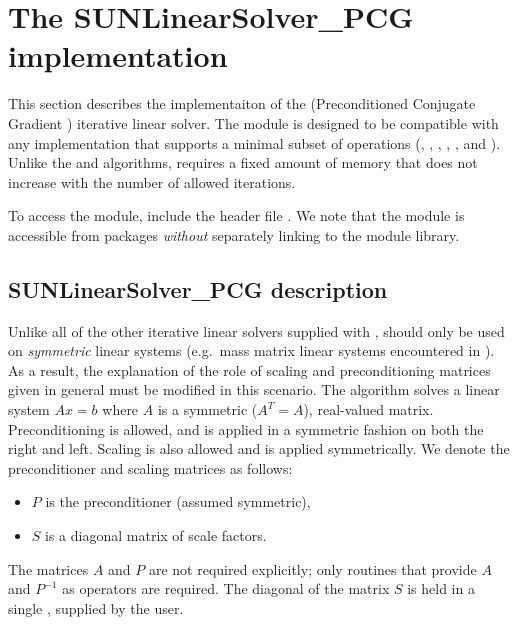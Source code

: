 \section{The SUNLinearSolver\_PCG implementation}
\label{ss:sunlinsol_pcg}

This section describes the {\sunlinsol} implementaiton of the {\pcg}
(Preconditioned Conjugate Gradient \cite{HeSt:52})
iterative linear solver. The {\sunlinsolpcg} module is designed to be
compatible with any {\nvector} implementation that supports a minimal subset
of operations (, , ,
, , and ). Unlike the {\spgmr}
and {\spfgmr} algorithms, {\pcg} requires a fixed amount of memory that does
not increase with the number of allowed iterations.

To access the {\sunlinsolpcg} module, include the header file \newline
{}. We note that the {\sunlinsolpcg} module is
accessible from {\sundials} packages \textit{without} separately linking to
the  module library.


\subsection{SUNLinearSolver\_PCG description}
\label{ss:sunlinsol_pcg_description}

Unlike all of the other iterative linear solvers supplied with
{\sundials}, {\pcg} should only be used on \emph{symmetric} linear
systems (e.g.~mass matrix linear systems encountered in
{\arkode}). As a result, the explanation of the role of scaling and
preconditioning matrices given in general must be modified in this
scenario.  The {\pcg} algorithm solves a linear system $Ax = b$ where
$A$ is a symmetric ($A^T=A$), real-valued matrix.  Preconditioning is
allowed, and is applied in a symmetric fashion on both the right and
left.  Scaling is also allowed and is applied symmetrically.  We
denote the preconditioner and scaling matrices as follows:
\begin{itemize}
\item $P$ is the preconditioner (assumed symmetric),
\item $S$ is a diagonal matrix of scale factors.
\end{itemize}
The matrices $A$ and $P$ are not required explicitly; only routines
that provide $A$ and $P^{-1}$ as operators are required.  The diagonal
of the matrix $S$ is held in a single {\nvector}, supplied by the user.


